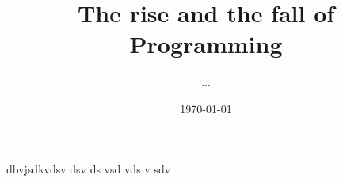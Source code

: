 \documentclass{report}
\begin{document}
\title{The rise and the fall of Programming}
\author{...}
\date{\today}


dbvjsdkvdsv
dsv
ds
vsd
vds
v
sdv
\end{document}
